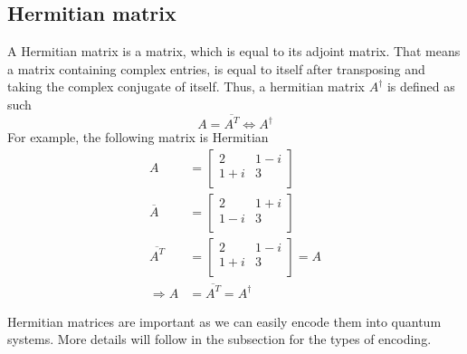 \subsection{Hermitian matrix}
A Hermitian matrix is a matrix, which is equal to its adjoint matrix. 
That means a matrix containing complex entries, is equal to itself after transposing and taking the complex conjugate of itself. 
Thus, a hermitian matrix $A^\dagger$ is defined as such
\begin{equation}
 A = \overline{A^T} \Leftrightarrow A^\dagger
\end{equation}
For example, the following matrix is Hermitian
\begin{equation}
\begin{split}
A &= \begin{bmatrix} 2 & 1-i \\ 1+i & 3 \\ \end{bmatrix} \\
\overline A &= \begin{bmatrix} 2 & 1+i \\ 1-i & 3 \\ \end{bmatrix}\\
\overline{A^T} &= \begin{bmatrix} 2 & 1-i \\ 1+i & 3 \\ \end{bmatrix} = A\\
\Rightarrow A &= \overline{A^T} = A^\dagger
\end{split}
\end{equation}

Hermitian matrices are important as we can easily encode them into quantum systems.
More details will follow in the subsection for the types of encoding.

